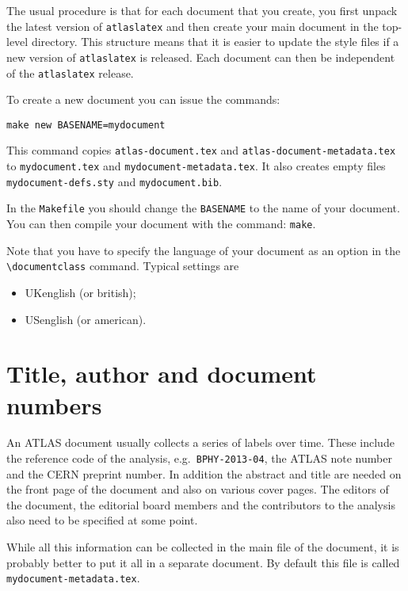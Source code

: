 \documentclass[atlasstyle,UKenglish]{latex/atlasdoc}
\newcommand{\File}[1]{\texttt{#1}\xspace}
\newcommand{\Macro}[1]{\texttt{\textbackslash #1}\xspace}
\newcommand{\Package}[1]{\texttt{#1}\xspace}
\begin{document}
The usual procedure is that for each document that you create,
you first unpack the latest version of \Package{atlaslatex} and
then create your main document in the top-level directory.
This structure means that it is easier to update the style files if a new version of
\Package{atlaslatex} is released. 
Each document can then be independent of the \Package{atlaslatex} release.

To create a new document you can issue the commands:
%
\begin{verbatim}
make new BASENAME=mydocument
\end{verbatim}
%
This command copies \File{atlas-document.tex} and
\File{atlas-document-metadata.tex}
to \File{mydocument.tex} and \File{mydocument-metadata.tex}.
It also creates empty files \File{mydocument-defs.sty} and \File{mydocument.bib}.

In the \File{Makefile} you should change the \texttt{BASENAME} to the name of your document.
You can then compile your document with the command: \texttt{make}.

Note that you have to specify the language of your document as an option in the
\Macro{documentclass} command. Typical settings are
\begin{itemize}
\item UKenglish (or british);
\item USenglish (or american).
\end{itemize}


\section{Title, author and document numbers}
\label{sec:metadata}

An ATLAS document usually collects a series of labels over time.
These include the reference code of the analysis, e.g.\ \texttt{BPHY-2013-04}, 
the ATLAS note number and the CERN preprint number.
In addition the abstract and title are needed on the front page of the document and also on various cover pages.
The editors of the document, the editorial board members and the contributors to the analysis
also need to be specified at some point.

While all this information can be collected in the main file of the document, 
it is probably better to put it all in a separate document.
By default this file is called \texttt{mydocument-metadata.tex}.
\end{document}
